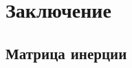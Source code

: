         \section{Заключение}
                
                \clearpage

        
        
        \clearpage

        \begin{appendices}
                
                
                \section{Матрица инерции}
        \end{appendices}
